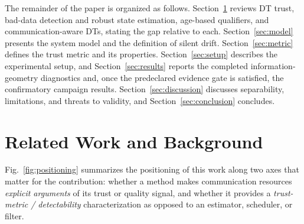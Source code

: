 \documentclass[journal]{IEEEtran}
\theoremstyle{plain}
\theoremstyle{definition}
\theoremstyle{remark}
\begin{document}
The remainder of the paper is organized as follows.
Section~\ref{sec:related} reviews DT trust, bad-data detection and robust
state estimation, age-based qualifiers, and communication-aware DTs,
stating the gap relative to each. Section~\ref{sec:model} presents the
system model and the definition of silent drift.
Section~\ref{sec:metric} defines the trust metric and its properties.
Section~\ref{sec:setup} describes the experimental setup, and
Section~\ref{sec:results} reports the completed information-geometry
diagnostics and, once the predeclared evidence gate is satisfied, the
confirmatory campaign results.
Section~\ref{sec:discussion} discusses separability, limitations, and
threats to validity, and Section~\ref{sec:conclusion} concludes.

\section{Related Work and Background}
\label{sec:related}

Fig.~\ref{fig:positioning} summarizes the positioning of this work along
two axes that matter for the contribution: whether a method makes
communication resources \emph{explicit arguments} of its trust or quality
signal, and whether it provides a \emph{trust-metric / detectability}
characterization as opposed to an estimator, scheduler, or filter.
\end{document}
